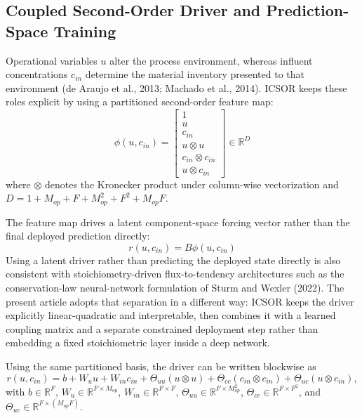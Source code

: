 \documentclass[a4paper,fleqn]{cas-sc}
\newenvironment{revblock}{\begingroup\color{revDefault}}{\endgroup}
\begin{document}
\begin{revblock}
\subsection{Coupled Second-Order Driver and Prediction-Space Training}

Operational variables $u$ alter the process environment, whereas influent concentrations $c_{in}$ determine the material inventory presented to that environment (de Araujo et al., 2013; Machado et al., 2014). ICSOR keeps these roles explicit by using a partitioned second-order feature map:
\begin{equation}
\label{eq:feature-map}
\phi(u, c_{in}) = \begin{bmatrix}
1 \\
 u \\
 c_{in} \\
 u \otimes u \\
 c_{in} \otimes c_{in} \\
 u \otimes c_{in}
\end{bmatrix} \in \mathbb{R}^{D}
\end{equation}
where $\otimes$ denotes the Kronecker product under column-wise vectorization and $D = 1 + M_{op} + F + M_{op}^2 + F^2 + M_{op}F$.

The feature map drives a latent component-space forcing vector rather than the final deployed prediction directly:
\begin{equation}
\label{eq:latent-driver}
 r(u, c_{in}) = B \phi(u, c_{in})
\end{equation}
Using a latent driver rather than predicting the deployed state directly is also consistent with stoichiometry-driven flux-to-tendency architectures such as the conservation-law neural-network formulation of Sturm and Wexler (2022). The present article adopts that separation in a different way: ICSOR keeps the driver explicitly linear-quadratic and interpretable, then combines it with a learned coupling matrix and a separate constrained deployment step rather than embedding a fixed stoichiometric layer inside a deep network.

Using the same partitioned basis, the driver can be written blockwise as
\begin{equation}
\label{eq:blockwise-driver}
 r(u, c_{in}) = b + W_u u + W_{in} c_{in} + \Theta_{uu}(u \otimes u) + \Theta_{cc}(c_{in} \otimes c_{in}) + \Theta_{uc}(u \otimes c_{in}),
\end{equation}
with $b \in \mathbb{R}^{F}$, $W_u \in \mathbb{R}^{F \times M_{op}}$, $W_{in} \in \mathbb{R}^{F \times F}$, $\Theta_{uu} \in \mathbb{R}^{F \times M_{op}^2}$, $\Theta_{cc} \in \mathbb{R}^{F \times F^2}$, and $\Theta_{uc} \in \mathbb{R}^{F \times (M_{op}F)}$.


\end{revblock}
\end{document}
